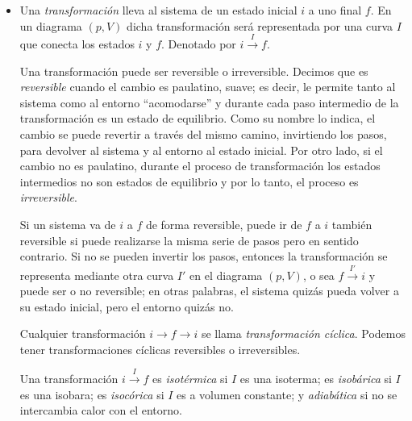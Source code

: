 \documentclass[openany]{book}
\begin{document}
\begin{itemize}
	\item Una \emph{transformación} lleva al sistema de un estado inicial $i$ a uno final $f$. En un diagrama $(p,V)$ dicha transformación será representada por una curva $I$ que conecta los estados $i$ y $f$. Denotado por $i\xrightarrow{I}f$.\par Una transformación puede ser reversible o irreversible. Decimos que es \emph{reversible} cuando el cambio es paulatino, suave; es decir, le permite tanto al sistema como al entorno ``acomodarse'' y durante cada paso intermedio de la transformación es un estado de equilibrio. Como su nombre lo indica, el cambio se puede revertir a través del mismo camino, invirtiendo los pasos, para devolver al sistema y al entorno al estado inicial. Por otro lado, si el cambio no es paulatino, durante el proceso de transformación los estados intermedios no son estados de equilibrio y por lo tanto, el proceso es \emph{irreversible}.\par Si un sistema va de $i$ a $f$ de forma reversible, puede ir de $f$ a $i$ también reversible si puede realizarse la misma serie de pasos pero en sentido contrario. Si no se pueden invertir los pasos, entonces la transformación se representa mediante otra curva $I'$ en el diagrama $(p,V)$, o sea $f\xrightarrow{I'}i$ y puede ser o no reversible; en otras palabras, el sistema quizás pueda volver a su estado inicial, pero el entorno quizás no.\par Cualquier transformación $ i\rightarrow f\rightarrow i $ se llama \emph{transformación cíclica}. Podemos tener transformaciones cíclicas reversibles o irreversibles.\par Una transformación $i\xrightarrow{I}f$ es \emph{isotérmica} si $I$ es una isoterma; es \emph{isobárica} si $I$ es una isobara; es \emph{isocórica} si $I$ es a volumen constante; y \emph{adiabática} si no se intercambia calor con el entorno.
\end{itemize}
\end{document}
